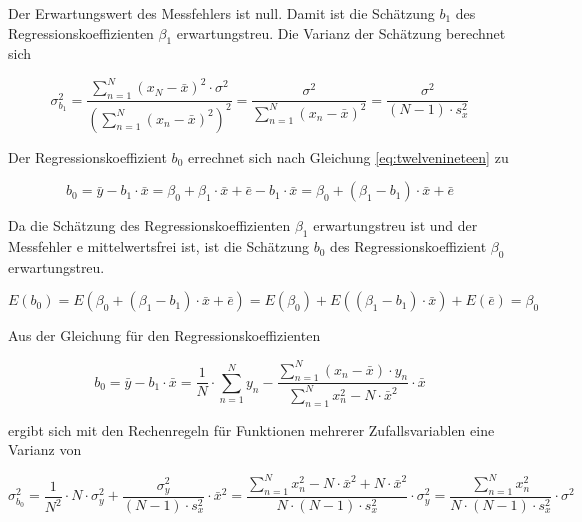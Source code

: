 \noindent Der Erwartungswert des Messfehlers ist null. Damit ist die Sch\"{a}tzung $b_{1}$ des Regressionskoeffizienten $\beta_{1}$ erwartungstreu. Die Varianz der Sch\"{a}tzung berechnet sich 

\begin{equation}\label{eq:twelvethirtytwo}
\sigma _{b_{1} }^{2} =\dfrac{\sum\limits _{n=1}^{N}(x_{N} -\bar{x})^{2}  \cdot \sigma ^{2} }{\left(\sum\limits _{n=1}^{N}(x_{n} -\bar{x})^{2}  \right)^{2}} =\dfrac{\sigma ^{2}}{\sum\limits _{n=1}^{N}(x_{n} -\bar{x})^{2}} =\dfrac{\sigma ^{2}}{(N-1)\cdot s_{x}^{2}}
\end{equation}

\noindent Der Regressionskoeffizient $b_{0}$ errechnet sich nach Gleichung \eqref{eq:twelvenineteen} zu

\begin{equation}\label{eq:twelvethirtythree}
b_{0} =\bar{y}-b_{1} \cdot \bar{x}=\beta _{0} +\beta _{1} \cdot \bar{x}+\bar{e}-b_{1} \cdot \bar{x}=\beta _{0} +(\beta _{1} -b_{1})\cdot \bar{x}+\bar{e}
\end{equation}

\noindent Da die Sch\"{a}tzung des Regressionskoeffizienten $\beta_{1}$ erwartungstreu ist und der Messfehler e mittelwertsfrei ist, ist die Sch\"{a}tzung $b_{0}$ des Regressionskoeffizient $\beta_{0}$ erwartungstreu.

\begin{equation}\label{eq:twelvethirtyfour}
E(b_{0})=E\left(\beta _{0} +\left(\beta _{1} -b_{1} \right)\cdot \bar{x}+\bar{e}\right)=E\left(\beta _{0} \right)+E\left((\beta _{1} -b_{1})\cdot \bar{x}\right)+E(\bar{e})=\beta _{0}
\end{equation}

\noindent Aus der Gleichung f\"{u}r den Regressionskoeffizienten

\begin{equation}\label{eq:twelvethirtyfive}
b_{0} =\bar{y}-b_{1} \cdot \bar{x}=\dfrac{1}{N} \cdot \sum\limits _{n=1}^{N}y_{n}  -\dfrac{\sum\limits _{n=1}^{N}\left(x_{n} -\bar{x}\right)\cdot y_{n}}{\sum\limits _{n=1}^{N}x_{n}^{2}  -N\cdot \bar{x}^{2} } \cdot \bar{x}
\end{equation}

\noindent ergibt sich mit den Rechenregeln f\"{u}r Funktionen mehrerer Zufallsvariablen eine Varianz von

\begin{equation}\label{eq:twelvethirtysix}
\sigma _{b_{0} }^{2} =\dfrac{1}{N^{2} } \cdot N\cdot \sigma _{y}^{2} +\dfrac{\sigma _{y}^{2} }{(N-1)\cdot s_{x}^{2} } \cdot \bar{x}^{2} =\dfrac{\sum\limits _{n=1}^{N}x_{n}^{2} -N\cdot \bar{x}^{2}  +N\cdot \bar{x}^{2} }{N\cdot (N-1)\cdot s_{x}^{2} } \cdot \sigma _{y}^{2} =\dfrac{\sum\limits _{n=1}^{N}x_{n}^{2}  }{N\cdot (N-1)\cdot s_{x}^{2} } \cdot \sigma ^{2}
\end{equation}

